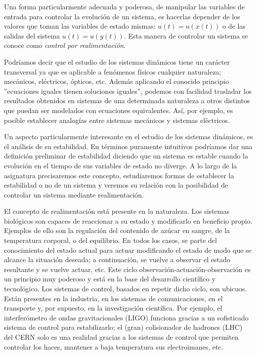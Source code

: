\begin{enumerate}
Una forma particularmente adecuada y poderosa, de manipular las variables de entrada para controlar la evolución de un sistema, es hacerlas depender de los valores que toman las variables de estado mismas: $u(t) = u(x(t))$ o de las salidas del sistema $u(t) = u(y(t))$. Esta manera de controlar un sistema se conoce como \emph{control por realimentación}.
\end{enumerate}

Podríamos decir que el estudio de los sistemas dinámicos tiene un carácter transversal ya que es aplicable a fenómenos físicos cualquier naturaleza; mecánicos, eléctricos, ópticos, etc. Además aplicando el conocido principio ''ecuaciones iguales tienen soluciones iguales'', podemos  con facilidad trasladar los resultados obtenidos en sistemas de una determinada naturaleza a otros distintos que puedan ser modelados con ecuaciones equivalentes. Así, por ejemplo, es posible establecer analogías entre sistemas mecánicos y sistemas eléctricos.

Un aspecto particularmente interesante en el estudio de los sistemas dinámicos, es el análisis de su estabilidad. En términos puramente intuitivos podríamos dar una definición preliminar de estabilidad diciendo que un sistema es estable cuando la evolución en el tiempo de sus variables de estado no diverge. A lo largo de la asignatura precisaremos este concepto, estudiaremos formas de establecer la estabilidad o no de un sistema y veremos su relación con la posibilidad de controlar un sistema mediante realimentación.

El concepto de realimentación está presente en la naturaleza. Los sistemas biológicos son capaces de reaccionar a su estado y modificarlo en beneficio propio.  Ejemplos de ello son la regulación del contenido de azúcar en sangre, de la temperatura corporal, o del equilibrio. En todos los casos, se parte del conocimiento del estado actual para actuar modificando el estado de modo que se alcance la situación deseada; a continuación, se vuelve a observar el estado resultante y se vuelve actuar, etc. Este ciclo observación-actuación-observación es un principio muy poderoso y está en la base del desarrollo científico y tecnológico. Los sistemas de control, basados en repetir dicho ciclo, son ubicuos. Están presentes en la industria, en los sistemas de comunicaciones, en el transporte y, por supuesto, en la investigación científica. Por ejemplo, el interferómetro de ondas gravitacionales  (LIGO) funciona gracias a un sofisticado sistema de control para estabilizarlo; el (gran) colisionador de hadrones (LHC) del CERN solo es una realidad gracias a los sistemas de control que permiten controlar los haces, mantener a baja temperatura sus electroimanes, etc.

